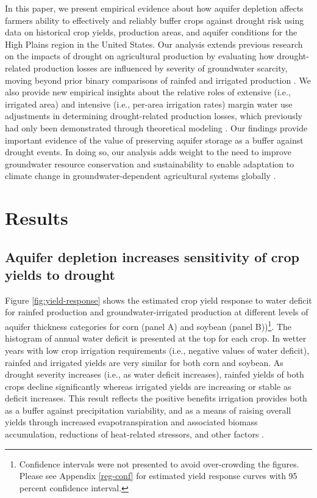 \documentclass[
]{article}
\begin{document}
In this paper, we present empirical evidence about how aquifer depletion affects farmers ability to effectively and reliably buffer crops against drought risk using data on historical crop yields, production areas, and aquifer conditions for the High Plains region in the United States. Our analysis extends previous research on the impacts of drought on agricultural production by evaluating how drought-related production losses are influenced by severity of groundwater scarcity, moving beyond prior binary comparisons of rainfed and irrigated production \citep{schlenker2009nonlinear, lobell2014greater, lu2018crop}. We also provide new empirical insights about the relative roles of extensive (i.e., irrigated area) and intensive (i.e., per-area irrigation rates) margin water use adjustments in determining drought-related production losses, which previously had only been demonstrated through theoretical modeling \citep{foster2014modeling, foster2017effects, rad2020effects}. Our findings provide important evidence of the value of preserving aquifer storage as a buffer against drought events. In doing so, our analysis adds weight to the need to improve groundwater resource conservation and sustainability to enable adaptation to climate change in groundwater-dependent agricultural systems globally \citep{jain2021groundwater, scanlon2023global}.

\hypertarget{results}{%
\section{Results}\label{results}}

\hypertarget{impact-intensive}{%
\subsection{Aquifer depletion increases sensitivity of crop yields to drought}\label{impact-intensive}}

Figure \ref{fig:yield-response} shows the estimated crop yield response to water deficit for rainfed production and groundwater-irrigated production at different levels of aquifer thickness categories for corn (panel A) and soybean (panel B))\footnote{Confidence intervals were not presented to avoid over-crowding the figures. Please see Appendix \ref{reg-conf} for estimated yield response curves with 95 percent confidence interval.}. The histogram of annual water deficit is presented at the top for each crop. In wetter years with low crop irrigation requirements (i.e., negative values of water deficit), rainfed and irrigated yields are very similar for both corn and soybean. As drought severity increases (i.e., as water deficit increases), rainfed yields of both crops decline significantly whereas irrigated yields are increasing or stable as deficit increases. This result reflects the positive benefits irrigation provides both as a buffer against precipitation variability, and as a means of raising overall yields through increased evapotranspiration and associated biomass accumulation, reductions of heat-related stressors, and other factors \citep{zhu2022untangling, li2020quantifying}.
\end{document}
